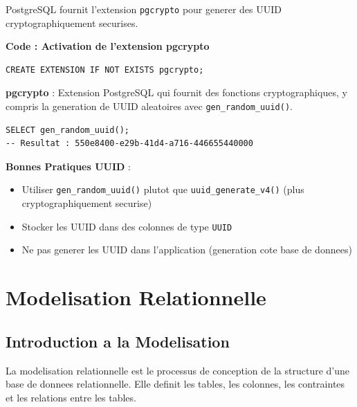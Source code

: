 \documentclass[a4paper,12pt]{book}
\begin{document}
PostgreSQL fournit l'extension \texttt{pgcrypto} pour generer des UUID cryptographiquement securises.

\noindent\textbf{Code : Activation de l'extension pgcrypto}
\begin{lstlisting}[style=sql]
CREATE EXTENSION IF NOT EXISTS pgcrypto;
\end{lstlisting}

\begin{definitionbox}
    \textbf{pgcrypto} : Extension PostgreSQL qui fournit des fonctions cryptographiques, y compris la generation de UUID aleatoires avec \texttt{gen\_random\_uuid()}.
\end{definitionbox}

\begin{lstlisting}[style=sql, caption=Generation d'un UUID]
SELECT gen_random_uuid();
-- Resultat : 550e8400-e29b-41d4-a716-446655440000
\end{lstlisting}

\begin{bestpracticebox}
    \textbf{Bonnes Pratiques UUID} :
    \begin{itemize}
        \item Utiliser \texttt{gen\_random\_uuid()} plutot que \texttt{uuid\_generate\_v4()} (plus cryptographiquement securise)
        \item Stocker les UUID dans des colonnes de type \texttt{UUID}
        \item Ne pas generer les UUID dans l'application (generation cote base de donnees)
    \end{itemize}
\end{bestpracticebox}

\chapter{Modelisation Relationnelle}

\section{Introduction a la Modelisation}

La modelisation relationnelle est le processus de conception de la structure d'une base de donnees relationnelle. Elle definit les tables, les colonnes, les contraintes et les relations entre les tables.
\end{document}

